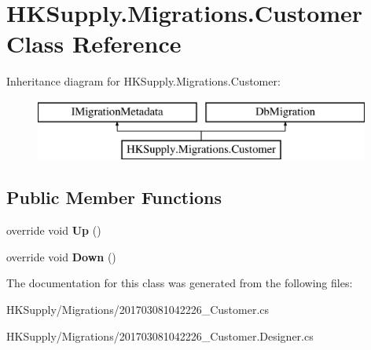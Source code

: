 \hypertarget{class_h_k_supply_1_1_migrations_1_1_customer}{}\section{H\+K\+Supply.\+Migrations.\+Customer Class Reference}
\label{class_h_k_supply_1_1_migrations_1_1_customer}
Inheritance diagram for H\+K\+Supply.\+Migrations.\+Customer\+:\begin{figure}[H]
\begin{center}
\leavevmode
\includegraphics[height=2.000000cm]{class_h_k_supply_1_1_migrations_1_1_customer}
\end{center}
\end{figure}
\subsection*{Public Member Functions}
\begin{DoxyCompactItemize}
\item 
\mbox{\label{class_h_k_supply_1_1_migrations_1_1_customer_a9d32a655fbb798821b0d9991eadd4a2f}} 
override void {\bfseries Up} ()
\item 
\mbox{\label{class_h_k_supply_1_1_migrations_1_1_customer_acc6e78c39b5f866e1b4dfec67ddd5c35}} 
override void {\bfseries Down} ()
\end{DoxyCompactItemize}


The documentation for this class was generated from the following files\+:\begin{DoxyCompactItemize}
\item 
H\+K\+Supply/\+Migrations/201703081042226\+\_\+\+Customer.\+cs\item 
H\+K\+Supply/\+Migrations/201703081042226\+\_\+\+Customer.\+Designer.\+cs\end{DoxyCompactItemize}
